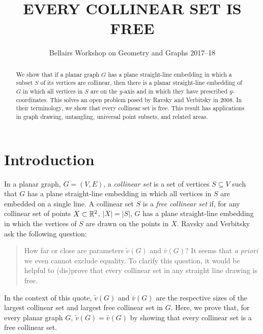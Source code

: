 \documentclass{patmorin}
\title{\MakeUppercase{Every Collinear Set is Free}}
\author{Bellairs Workshop on Geometry and Graphs 2017--18}
\begin{document}
\maketitle


\begin{abstract}
  We show that if a planar graph $G$ has a plane straight-line embedding
  in which a subset $S$ of its vertices are collinear, then there is a
  planar straight-line embedding of $G$ in which all vertices in $S$ are
  on the $y$-axis and in which they have prescribed $y$-coordinates.
  This solves an open problem posed by Ravsky and Verbitsky in 2008.
  In their terminology, we show that every collinear set is free.
  This result has applications in graph drawing, untangling, universal
  point subsets, and related areas.
\end{abstract}


\section{Introduction}

In a planar graph, $G=(V,E)$, a \emph{collinear set} is a set of vertices
$S\subseteq V$ such that $G$ has a plane straight-line embedding in which
all vertices in $S$ are embedded on a single line.  A collinear set $S$
is a \emph{free collinear set} if, for any collinear set of points
$X\subset\mathbb{R}^2$, $|X|=|S|$, $G$ has a plane straight-line embedding in
which the vertices of $S$ are drawn on the points in $X$.  Ravsky and
Verbitsky \cite{ravsky.verbitsky:on,ravsky.verbitsky:on-arxiv} ask the
following question:

\begin{quote}
   How far or close are parameters $\tilde{v}(G)$ and $\bar{v}(G)$? It
   seems that \emph{a priori} we even cannot exclude equality. To clarify
   this question, it would be helpful to (dis)prove that every collinear
   set in any straight line drawing is free.
\end{quote}

In the context of this quote, $\tilde{v}(G)$ and $\bar{v}(G)$ are
the respective sizes of the largest collinear set and largest free
collinear set in $G$.  Here, we prove that, for every planar graph $G$,
$\tilde{v}(G)=\bar{v}(G)$ by showing that every collinear set is a free
collinear set.
\end{document}
